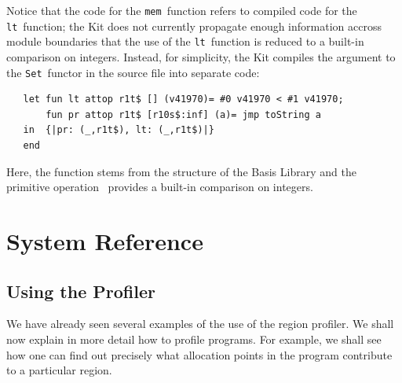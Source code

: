 \documentclass[12pt]{book}
\begin{document}
Notice that the code for the {\tt mem}~function refers to compiled
code for the {\tt lt}~function; the Kit does not currently
propagate enough information accross module boundaries that the use of
the {\tt lt}~function is reduced to a built-in comparison on
integers. Instead, for simplicity, the Kit compiles the argument to
the {\tt Set}~functor in the source file  into
separate code:
\begin{verbatim}
   let fun lt attop r1t$ [] (v41970)= #0 v41970 < #1 v41970; 
       fun pr attop r1t$ [r10s$:inf] (a)= jmp toString a
   in  {|pr: (_,r1t$), lt: (_,r1t$)|}
   end 
\end{verbatim}
Here, the  function stems from the 
structure of the Basis Library and the primitive operation~\boxml{<} provides a built-in comparison
on integers.

\part{System Reference}
%
\chapter{Using the Profiler}
%
\label{useOfProf.sec}
We have already seen several examples of the use of the region profiler. We
shall now explain in more detail how to profile programs. For example, we shall see
how one can find out precisely what allocation points in the program
contribute to a particular region.
\end{document}
